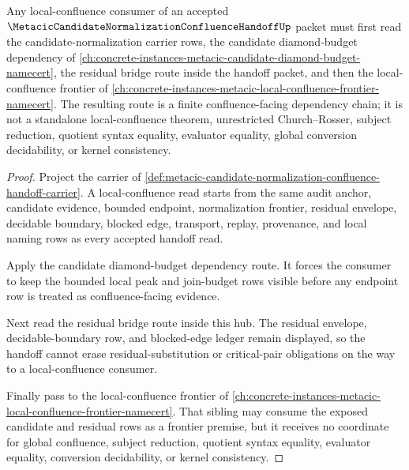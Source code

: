 \begin{theorem}
\label{thm:metacic-candidate-normalization-local-confluence-route}
Any local-confluence consumer of an accepted $\MetacicCandidateNormalizationConfluenceHandoffUp$ packet must first read the candidate-normalization carrier rows, the candidate diamond-budget dependency of \autoref{ch:concrete-instances-metacic-candidate-diamond-budget-namecert}, the residual bridge route inside the handoff packet, and then the local-confluence frontier of \autoref{ch:concrete-instances-metacic-local-confluence-frontier-namecert}. The resulting route is a finite confluence-facing dependency chain; it is not a standalone local-confluence theorem, unrestricted Church--Rosser, subject reduction, quotient syntax equality, evaluator equality, global conversion decidability, or kernel consistency.
\end{theorem}
\begin{proof}
Project the carrier of \autoref{def:metacic-candidate-normalization-confluence-handoff-carrier}. A local-confluence read starts from the same audit anchor, candidate evidence, bounded endpoint, normalization frontier, residual envelope, decidable boundary, blocked edge, transport, replay, provenance, and local naming rows as every accepted handoff read.

Apply the candidate diamond-budget dependency route. It forces the consumer to keep the bounded local peak and join-budget rows visible before any endpoint row is treated as confluence-facing evidence.

Next read the residual bridge route inside this hub. The residual envelope, decidable-boundary row, and blocked-edge ledger remain displayed, so the handoff cannot erase residual-substitution or critical-pair obligations on the way to a local-confluence consumer.

Finally pass to the local-confluence frontier of \autoref{ch:concrete-instances-metacic-local-confluence-frontier-namecert}. That sibling may consume the exposed candidate and residual rows as a frontier premise, but it receives no coordinate for global confluence, subject reduction, quotient syntax equality, evaluator equality, conversion decidability, or kernel consistency.
\end{proof}
